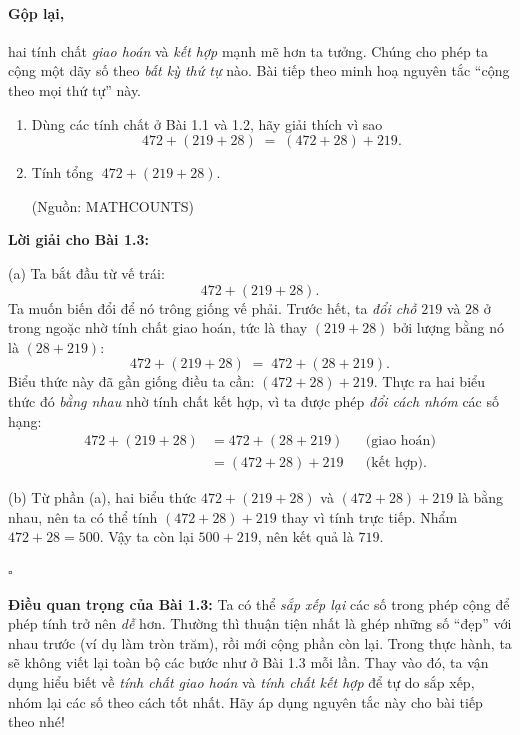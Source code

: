 
\paragraph{Gộp lại,} hai tính chất \emph{giao hoán} và \emph{kết hợp}
mạnh mẽ hơn ta tưởng. Chúng cho phép ta cộng một dãy số theo \emph{bất
kỳ thứ tự} nào. Bài tiếp theo minh hoạ nguyên tắc “cộng theo mọi thứ
tự” này.

\begin{problem}[1.3]
\begin{enumerate}[label=(\alph*)]
  \item Dùng các tính chất ở Bài 1.1 và 1.2, hãy giải thích vì sao
  \[
    472 + (219 + 28) \;=\; (472 + 28) + 219.
  \]
  \item Tính tổng \(\;472 + (219 + 28)\).
  \begin{flushright}\small(Nguồn: MATHCOUNTS)\end{flushright}
\end{enumerate}
\end{problem}

\noindent\textbf{Lời giải cho Bài 1.3:}

\smallskip
\noindent(a)\; Ta bắt đầu từ vế trái:
\[
  472 + (219 + 28).
\]
Ta muốn biến đổi để nó trông giống vế phải. Trước hết, ta \emph{đổi
chỗ} \(219\) và \(28\) ở trong ngoặc nhờ tính chất giao hoán, tức là
thay \((219+28)\) bởi lượng bằng nó là \((28+219)\):
\[
  472 + (219 + 28) \;=\; 472 + (28 + 219).
\]
Biểu thức này đã gần giống điều ta cần: \((472 + 28) + 219\).
Thực ra hai biểu thức đó \emph{bằng nhau} nhờ tính chất kết hợp, vì ta
được phép \emph{đổi cách nhóm} các số hạng:
\[
\begin{aligned}
  472 + (219 + 28) 
  &= 472 + (28 + 219) && \text{(giao hoán)}\\
  &= (472 + 28) + 219 && \text{(kết hợp).}
\end{aligned}
\]

\smallskip
\noindent(b)\; Từ phần (a), hai biểu thức
\(472 + (219 + 28)\) và \((472 + 28) + 219\) là bằng nhau, nên ta có
thể tính \((472 + 28) + 219\) thay vì tính trực tiếp.
Nhẩm \(472 + 28 = 500\). Vậy ta còn lại \(500 + 219\),
nên kết quả là \(719\).

\medskip
\noindent\(\square\)

\medskip
\noindent\textbf{Điều quan trọng của Bài 1.3:} Ta có thể \emph{sắp xếp
lại} các số trong phép cộng để phép tính trở nên \emph{dễ} hơn. Thường
thì thuận tiện nhất là ghép những số “đẹp” với nhau trước (ví dụ làm
tròn trăm), rồi mới cộng phần còn lại. Trong thực hành, ta sẽ không
viết lại toàn bộ các bước như ở Bài 1.3 mỗi lần. Thay vào đó, ta vận
dụng hiểu biết về \emph{tính chất giao hoán} và \emph{tính chất kết
hợp} để tự do sắp xếp, nhóm lại các số theo cách tốt nhất. Hãy áp dụng
nguyên tắc này cho bài tiếp theo nhé!


